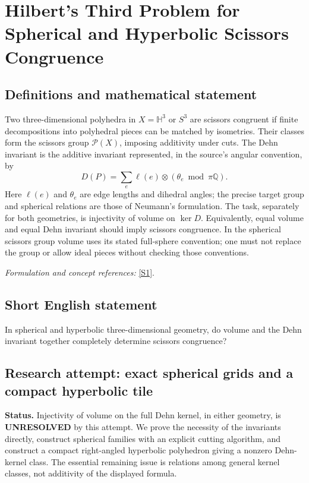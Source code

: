 \documentclass[11pt]{article}
\begin{document}
\section*{\texorpdfstring{Hilbert's Third Problem for Spherical and Hyperbolic Scissors Congruence}{Hilbert's Third Problem for Spherical and Hyperbolic Scissors Congruence}}\label{369}
\subsection{Definitions and mathematical statement}
Two three-dimensional polyhedra in $X=\mathbb H^3$ or $S^3$ are scissors congruent if finite decompositions into polyhedral pieces can be matched by isometries. Their classes form the scissors group $\mathcal P(X)$, imposing additivity under cuts. The Dehn invariant is the additive invariant represented, in the source's angular convention, by
\[
 D(P)=\sum_{e}\ell(e)\otimes(\theta_e\bmod\pi{\mathbb{Q}}).
\]
Here $\ell(e)$ and $\theta_e$ are edge lengths and dihedral angles; the precise target group and spherical relations are those of Neumann's formulation. The task, separately for both geometries, is injectivity of volume on $\ker D$. Equivalently, equal volume and equal Dehn invariant should imply scissors congruence. In the spherical scissors group volume uses its stated full-sphere convention; one must not replace the group or allow ideal pieces without checking those conventions.
\par\smallskip\textit{Formulation and concept references:} \href{https://arxiv.org/pdf/math/9712226}{[S1]}.

\subsection{Short English statement}
In spherical and hyperbolic three-dimensional geometry, do volume and the Dehn invariant together completely determine scissors congruence?
\subsection{Research attempt: exact spherical grids and a compact hyperbolic tile}
\textbf{Status.} Injectivity of volume on the full Dehn kernel, in either geometry, is \textbf{UNRESOLVED} by this attempt. We prove the necessity of the invariants directly, construct spherical families with an explicit cutting algorithm, and construct a compact right-angled hyperbolic polyhedron giving a nonzero Dehn-kernel class. The essential remaining issue is relations among general kernel classes, not additivity of the displayed formula.
\end{document}
